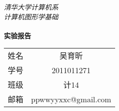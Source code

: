 
\newcommand{\HUGE}{\fontsize{29pt}{29pt}\selectfont}
\renewcommand{\today}{\number\year 年 \number\month 月 \number\day 日}
\begin{titlepage}


\phantom{Start!}

\vspace{-1.7cm}

\begin{flushleft}

\emph{\Large 清华大学计算机系}\\[0.2cm]

\emph{\Large 计算机图形学基础}\\[5.2cm]


\hspace{3cm}{ \HUGE \bfseries 光线追踪}\\[0.4cm]


\hspace{3cm} {\huge \bfseries 实验报告}

\end{flushleft}





\vfill



\begin{flushright}

{



\newcommand{\pillar}{ {\Huge \phantom{A}} }

\large

\begin{tabular}{lc}

\pillar 姓名 & 吴育昕\\\cline{2-2}

\pillar 学号 & 2011011271 \\\cline{2-2}

\pillar 班级 & 计14 \\\cline{2-2}

\pillar 邮箱 &ppwwyyxxc@gmail.com \\\cline{2-2}

\end{tabular}

}

\end{flushright}

\end{titlepage}
